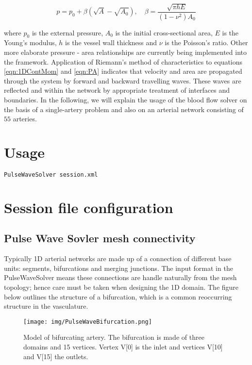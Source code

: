 \begin{equation}
p=p_{0}+\beta\left(\sqrt{A}-\sqrt{A_{0}}\right), \quad \beta=\frac{\sqrt{\pi h E}}{(1-\nu^{2})A_{0}}
\label{eqn:PA}
\end{equation}

where $p_{0}$ is the external pressure, $A_{0}$ is the initial cross-sectional area, $E$ is the Young's modulus, $h$ is the vessel wall thickness and $\nu$ is the Poisson's ratio. Other more elaborate pressure - area relationships are currently being implemented into the framework. Application of Riemann's method of characteristics to equations \ref{eqn:1DContMom} and \ref{eqn:PA} indicates that velocity and area are propagated through the system by forward and backward travelling waves. These waves are reflected and within the network by appropriate treatment of interfaces and boundaries. In the following, we will explain
the usage of the blood flow solver on the basis of a single-artery problem and
also on an arterial network consisting of $55$ arteries.

\section{Usage}
\begin{lstlisting}[style=BashInputStyle]
PulseWaveSolver session.xml
\end{lstlisting}

\section{Session file configuration}

\subsection{Pulse Wave Sovler mesh connectivity}
Typically 1D arterial networks are made up of a connection of different base units: segments, bifurcations and merging junctions. The input format in the PulseWaveSolver means these connections are handle naturally from the mesh topology; hence care must be taken when designing the 1D domain. The figure below outlines the structure of a bifurcation, which is a common reoccurring structure in the vasculature.

\begin{figure}
\begin{center}
\texttt{[image: img/PulseWaveBifurcation.png]}
\caption{Model of bifurcating artery. The bifurcation is made of three domains and 15 vertices. Vertex V[0] is the inlet and vertices V[10] and V[15] the outlets.}
\end{center}
\end{figure}

